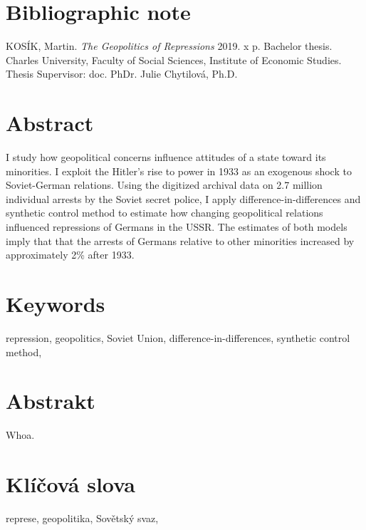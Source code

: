 \pagestyle{empty}

\section*{Bibliographic note}

\noindent KOSÍK, Martin. \textit{The Geopolitics of Repressions}  2019. x p.
Bachelor thesis. Charles University, Faculty of Social Sciences, Institute of Economic Studies. Thesis Supervisor: doc. PhDr. Julie Chytilová, Ph.D. \\

\section*{Abstract}
  I study how geopolitical concerns influence attitudes of a state toward its minorities. I exploit the  Hitler's rise to power in 1933 as an exogenous shock to Soviet-German relations. 
    Using the digitized archival data on 2.7 million individual arrests by the Soviet secret police, I apply difference-in-differences and synthetic control method to estimate how changing geopolitical relations influenced repressions of Germans in the USSR. The estimates of both models imply that that the arrests of Germans relative to other minorities increased by approximately 2\% after 1933. 

\section*{Keywords}
repression, geopolitics, Soviet Union, difference-in-differences, synthetic control method, \\
\newpage

\section*{Abstrakt}
Whoa. \\




\section*{Klíčová slova}
represe, geopolitika, Sovětský svaz, \\

\newpage
